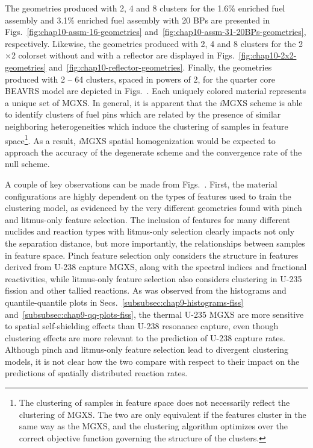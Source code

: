 
The geometries produced with 2, 4 and 8 clusters for the 1.6\% enriched fuel assembly and 3.1\% enriched fuel assembly with 20 \acp{BP} are presented in Figs.~\ref{fig:chap10-assm-16-geometries} and~\ref{fig:chap10-assm-31-20BPs-geometries}, respectively. Likewise, the geometries produced with 2, 4 and 8 clusters for the 2$\times$2 colorset without and with a reflector are displayed in Figs.~\ref{fig:chap10-2x2-geometries} and~\ref{fig:chap10-reflector-geometries}. Finally, the geometries produced with 2 -- 64 clusters, spaced in powers of 2, for the quarter core \ac{BEAVRS} model are depicted in Figs.~. Each uniquely colored material represents a unique set of MGXS. In general, it is apparent that the \textit{i}\ac{MGXS} scheme is able to identify clusters of fuel pins which are related by the presence of similar neighboring heterogeneities which induce the clustering of samples in feature space\footnote{The clustering of samples in feature space does not necessarily reflect the clustering of \ac{MGXS}. The two are only equivalent if the features cluster in the same way as the \ac{MGXS}, and the clustering algorithm optimizes over the correct objective function governing the structure of the clusters.}. As a result, \textit{i}\ac{MGXS} spatial homogenization would be expected to approach the accuracy of the degenerate scheme and the convergence rate of the null scheme. 

A couple of key observations can be made from Figs.~. First, the material configurations are highly dependent on the types of features used to train the clustering model, as evidenced by the very different geometries found with pinch and litmus-only feature selection. The inclusion of features for many different nuclides and reaction types with litmus-only selection clearly impacts not only the separation distance, but more importantly, the relationships between samples in feature space. Pinch feature selection only considers the structure in features derived from U-238 capture \ac{MGXS}, along with the spectral indices and fractional reactivities, while litmus-only feature selection also considers clustering in U-235 fission and other tallied reactions. As was observed from the histograms and quantile-quantile plots in Secs.~\ref{subsubsec:chap9-histograms-fiss} and~\ref{subsubsec:chap9-qq-plots-fiss}, the thermal U-235 \ac{MGXS} are more sensitive to spatial self-shielding effects than U-238 resonance capture, even though clustering effects are more relevant to the prediction of U-238 capture rates. Although pinch and litmus-only feature selection lead to divergent clustering models, it is not clear how the two compare with respect to their impact on the predictions of spatially distributed reaction rates. 

